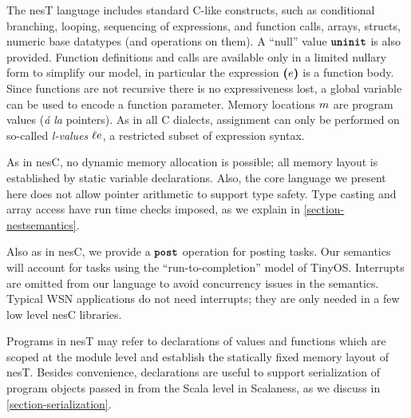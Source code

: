 \coresemanticsfig

The nesT language includes standard C-like constructs, such as conditional branching, looping,
sequencing of expressions, and function calls, arrays, structs, numeric base datatypes (and
operations on them). %
A ``null'' value $\mbox{\bf \texttt{uninit}}$ is also provided. Function definitions and calls are available only
in a limited nullary form to simplify our model, in particular the expression $\textbf{(}e\textbf{)}$ is a
function body. Since functions are not recursive there is no expressiveness lost, a global
variable can be used to encode a function parameter. Memory locations $m$ are program
values (\emph{\'a la} pointers). As in all C dialects, assignment can only be performed on
so-called \emph{l-values} $\ell e$, a restricted subset of expression syntax.

As in nesC, no dynamic memory allocation is possible; all memory layout is established by static
variable declarations. Also, the core language we present here does not allow pointer arithmetic
to support type safety. Type casting and array access have run time checks imposed, as we
explain in \autoref{section-nestsemantics}.

Also as in nesC, we provide a $\mbox{\bf \texttt{post}}$ operation for posting tasks. Our semantics will account
for tasks using the ``run-to-completion'' model of TinyOS. Interrupts are omitted from our
language to avoid concurrency issues in the semantics. Typical WSN applications do not need
interrupts; they are only needed in a few low level nesC libraries.

Programs in nesT may refer to declarations of values and functions which are scoped at the
module level and establish the statically fixed memory layout of nesT.
Besides convenience, declarations are useful to support serialization of program objects passed
in from the Scala level in Scalaness, as we discuss in \autoref{section-serialization}.

